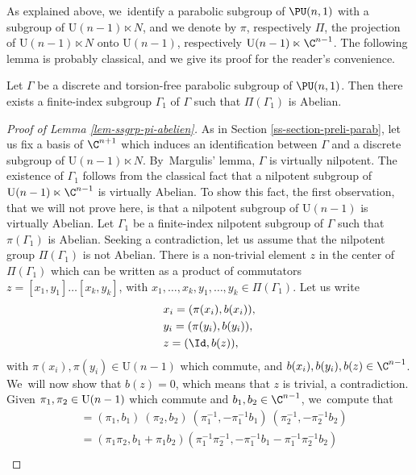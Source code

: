 As explained above, we~identify a parabolic subgroup of $\PU(n,1)$ with a subgroup of $\mathrm{U}(n-1)\ltimes N$, and we denote by $\pi$, respectively $\Pi $, the projection of $\mathrm{U}(n-1)\ltimes N$ onto $\mathrm{U}(n-1)$, respectively $ \mathrm{U}(n-1)\ltimes \C^{n-1}$. The following lemma is probably classical, and we give its proof for the reader's convenience.

\begin{lemma}\label{lem-ssgrp-pi-abelien}
Let $\Gamma$ be a discrete and torsion-free parabolic subgroup of $\PU(n,1)$. Then there exists a finite-index subgroup $\Gamma_1$ of $\Gamma$ such that $\Pi(\Gamma_1)$ is Abelian.
\end{lemma}

\begin{proof}[Proof of Lemma \ref{lem-ssgrp-pi-abelien}]
As in Section \ref{ss-section-preli-parab}, let us fix a basis of $\C^{n+1}$ which induces an identification between $\Gamma$ and a discrete subgroup of $\mathrm{U}(n-1)\ltimes N$. By~Margulis' lemma, $\Gamma$ is virtually nilpotent. The existence of $\Gamma_1$ follows from the classical fact that a nilpotent subgroup of $\mathrm{U}(n-1)\ltimes \C^{n-1}$ is virtually Abelian. To show this fact, the first observation, that we will not prove here, is that a nilpotent subgroup of $\mathrm{U}(n-1)$ is virtually Abelian. Let $\Gamma_1$ be a finite-index nilpotent subgroup of $\Gamma$ such that $\pi(\Gamma_1)$ is Abelian. Seeking a contradiction, let us assume that the nilpotent group $\Pi(\Gamma_1)$ is not Abelian. There is a non-trivial element $z$ in the center of $\Pi(\Gamma_1)$ which can be written as a product of commutators $z=[x_1,y_1]\dots[x_k,y_k]$, with $x_1,\dots,x_k,y_1,\dots,y_k\in \Pi(\Gamma_1)$. Let us write
\begin{align*}
&x_i=(\pi(x_i),b(x_i)),\\
&y_i=(\pi(y_i),b(y_i)),\\
&z= (\Id,b(z)),
\end{align*}
with $\pi(x_i),\pi(y_i)\in \mathrm{U}(n-1)$ which commute, and $b(x_i),b(y_i),b(z)\in \C^{n-1}$. We~will now show that $b(z)=0$, which means that $z$ is trivial, a contradiction.
Given $\pi_1,\pi_2\in\nobreak \mathrm{U}(n-\nobreak1)$ which commute and $b_1,b_2\in \C^{n-1}$, we~compute that
\begin{align*}
[(\pi_1,b_1),(\pi_2,b_2)]&=(\pi_1,b_1)\ (\pi_2,b_2)\ (\pi_1^{-1},-\pi_1^{-1}b_1)\ (\pi_2^{-1},-\pi_2^{-1}b_2) \\
&= (\pi_1\pi_2,b_1+\pi_1b_2)(\pi_1^{-1}\pi_2^{-1},-\pi_1^{-1}b_1 - \pi_1^{-1}\pi_2^{-1}b_2)\\

\end{align*}
\end{proof}
